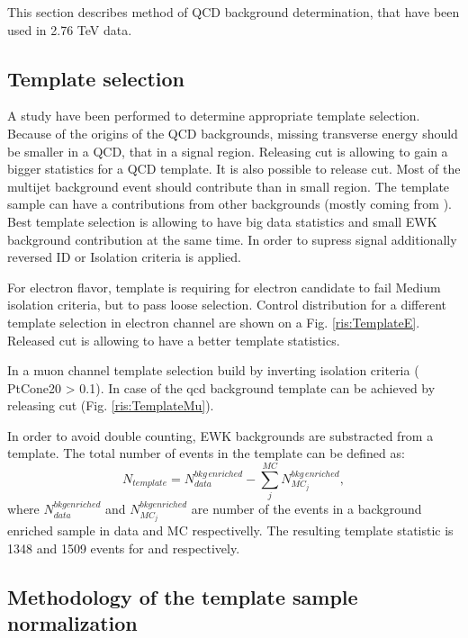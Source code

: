 This section describes method of QCD background determination, that have been used in 2.76 TeV data. 

\subsection{Template selection}

A study have been performed to determine appropriate template selection. Because of the origins of the QCD backgrounds, missing transverse energy \etmiss should be smaller in a QCD, that in a signal region. Releasing \etmiss cut is allowing to gain a bigger statistics for a QCD template. It is also possible to release \mtw cut. Most of the multijet background event should contribute than in small \mtw region. The template sample can have a contributions from other backgrounds (mostly coming from \wlnu). Best template selection is allowing to have big data statistics and small EWK background contribution at the same time. In order to supress signal additionally reversed ID or Isolation criteria is applied. 

For electron flavor, template is requiring for electron candidate to fail Medium isolation criteria, but to pass loose selection.  Control distribution for a different template selection in electron channel are shown on a Fig. \ref{ris:TemplateE}. Released \etmiss cut is allowing to have a better template statistics. 

In a muon channel template selection build by inverting isolation criteria ( PtCone20 > 0.1). In case of \wmunu the qcd background template can be achieved by releasing \mtw cut (Fig. \ref{ris:TemplateMu}). 

In order to avoid double counting, EWK backgrounds are substracted from a template. The total number of events in the template can be defined as:
\begin{equation}
N_{template} = N^{bkg\, enriched}_{data} - \sum_{j}^{MC} N_{MC_j}^{bkg\, enriched},
\end{equation}
where $N^{bkg enriched}_{data}$ and $N_{MC_j}^{bkg enriched}$ are number of the events in a background enriched sample in data and MC respectivelly. The resulting template statistic is 1348 and 1509 events for \wenu and \wmunu respectively. 


\subsection{Methodology of the template sample normalization}


